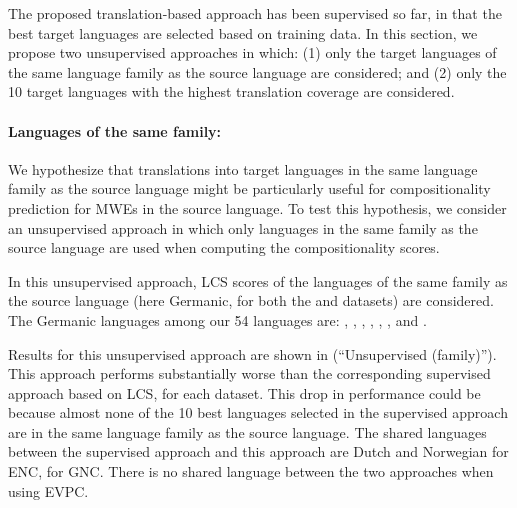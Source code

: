 \documentclass[output=paper
,modfonts
,nonflat]{langsci/langscibook}
\begin{document}
The proposed translation-based  approach has been
supervised so far, in that the best target languages are selected
based on training data. In this section, we propose two unsupervised
approaches in which: (1) only the target languages of the same language
family as the source language are considered; and (2) only the 10
target languages with the highest translation coverage are considered.

\paragraph*{Languages of the same family:}


We hypothesize that translations into target languages in the same
language family as the source language might be particularly useful
for compositionality prediction for MWEs in the source language. To
test this hypothesis, we consider an unsupervised approach in which
only languages in the same family as the source language are used when
computing the compositionality scores.

In this unsupervised approach, LCS scores of the languages of the same
family as the source language (here Germanic, for both the  and
 datasets) are considered. The Germanic languages among our 54
languages are: , , , , ,
,  and .

Results for this unsupervised approach are shown in
 (``Unsupervised (family)''). This
approach performs substantially worse than the corresponding
supervised approach based on LCS, for each dataset. This drop in
performance could be because almost none of the 10 best languages
selected in the supervised approach are in the same language family as
the source language. The shared languages between the supervised approach
and this approach are Dutch and Norwegian for ENC,  for GNC. 
There is no shared language between the two approaches when using EVPC.

\end{document}
